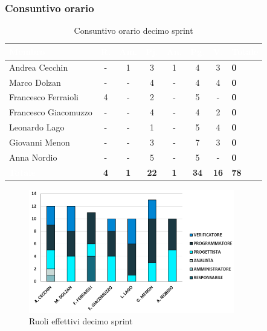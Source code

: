 \subsubsection{Consuntivo orario}
{
\setlength{\tabcolsep}{10pt}
\renewcommand{\arraystretch}{1.5}
\begin{table}[h!]
    \centering
    \begin{tabularx}{\textwidth}{| l | c | c | c | c | c | c | X |}
        \hline
        \rowcolor{headerrow} \textbf{\textcolor{white}{Membro}} & \textbf{\textcolor{white}{R.}} & \textbf{\textcolor{white}{Am.}} & \textbf{\textcolor{white}{Pj.}} & \textbf{\textcolor{white}{An.}} & \textbf{\textcolor{white}{Pg.}} & \textbf{\textcolor{white}{V.}} & \textbf{\textcolor{white}{Totale}} \\
        \hline
        Andrea Cecchin & - & 1 & 3 & 1 & 4 & 3 & \textbf{0} \\
        \hline
        Marco Dolzan & - & - & 4 & - & 4 & 4 & \textbf{0} \\
        \hline
        Francesco Ferraioli & 4 & - & 2 & - & 5 & - & \textbf{0} \\
        \hline  
        Francesco Giacomuzzo & - & - & 4 & - & 4 & 2 & \textbf{0} \\
        \hline
        Leonardo Lago & - & - & 1 & - & 5 & 4 & \textbf{0} \\
        \hline
        Giovanni Menon & - & - & 3 & - & 7 & 3 & \textbf{0} \\
        \hline
        Anna Nordio & - & - & 5 & - & 5 & - & \textbf{0} \\
        \hline
    \cellcolor{headerrow} \textbf{\textcolor{white}{Totale}} & \textbf{4} & \textbf{1} & \textbf{22} & \textbf{1} & \textbf{34} & \textbf{16} & \textbf{78} \\
        \hline
    \end{tabularx} 
    \caption{Consuntivo orario decimo sprint}
    \label{tab:consuntivoorario10sprint}
\end{table}
}

\begin{figure}[h!]
    \centering
    \includegraphics[width=0.8\textwidth]{cons10ruoli.png}
    \caption{Ruoli effettivi decimo sprint}
    \label{fig:consuntivoorario10sprint}
\end{figure}

